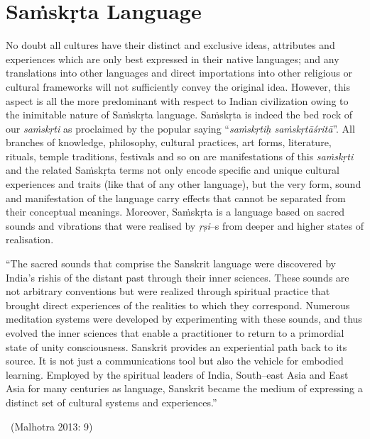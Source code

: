 \section*{Saṁskṛta Language}

No doubt all cultures have their distinct and exclusive ideas, attributes and experiences which are only best expressed in their native languages; and any translations into other languages and direct importations into other religious or cultural frameworks will not sufficiently convey the original idea. However, this aspect is all the more predominant with respect to Indian civilization owing to the inimitable nature of Saṁskṛta language. Saṁskṛta is indeed the bed rock of our \textit{saṁskṛti} as proclaimed by the popular saying “\textit{saṁskṛtiḥ saṁskṛtāśritā}”. All branches of knowledge, philosophy, cultural practices, art forms, literature, rituals, temple traditions, festivals and so on are manifestations of this \textit{saṁskṛti} and the related Saṁskṛta terms not only encode specific and unique cultural experiences and traits (like that of any other language), but the very form, sound and manifestation of the language carry effects that cannot be separated from their conceptual meanings. Moreover, Saṁskṛta is a language based on sacred sounds and vibrations that were realised by \textit{ṛṣi}–s from deeper and higher states of realisation.

\begin{myquote}
“The sacred sounds that comprise the Sanskrit language were discovered by India’s rishis of the distant past through their inner sciences. These sounds are not arbitrary conventions but were realized through spiritual practice that brought direct experiences of the realities to which they correspond. Numerous meditation systems were developed by experimenting with these sounds, and thus evolved the inner sciences that enable a practitioner to return to a primordial state of unity consciousness. Sanskrit provides an experiential path back to its source. It is not just a communications tool but also the vehicle for embodied learning. Employed by the spiritual leaders of India, South–east Asia and East Asia for many centuries as language, Sanskrit became the medium of expressing a distinct set of cultural systems and experiences.” 

~\hfill (Malhotra 2013: 9)
\end{myquote}

